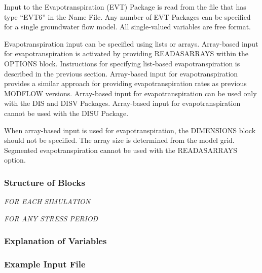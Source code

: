 Input to the Evapotranspiration (EVT) Package is read from the file that has type ``EVT6'' in the Name File. Any number of EVT Packages can be specified for a single groundwater flow model. All single-valued variables are free format.

Evapotranspiration input can be specified using lists or arrays.  Array-based input for evapotranspiration is activated by providing READASARRAYS within the OPTIONS block.   Instructions for specifying list-based evapotranspiration is described in the previous section.  Array-based input for evapotranspiration provides a similar approach for providing evapotranspiration rates as previous MODFLOW versions.  Array-based input for evapotranspiration can be used only with the DIS and DISV Packages.  Array-based input for evapotranspiration cannot be used with the DISU Package.

When array-based input is used for evapotranspiration, the DIMENSIONS block should not be specified.  The array size is determined from the model grid.   Segmented evapotranspiration cannot be used with the READASARRAYS option.

\vspace{5mm}
\subsubsection{Structure of Blocks}
\vspace{5mm}

\noindent \textit{FOR EACH SIMULATION}

\vspace{5mm}
\noindent \textit{FOR ANY STRESS PERIOD}


\vspace{5mm}
\subsubsection{Explanation of Variables}
\begin{description}

\end{description}

\vspace{5mm}
\subsubsection{Example Input File}


